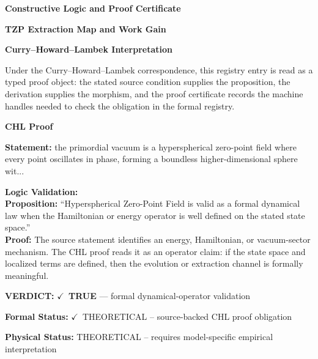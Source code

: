 \clearpage
\begingroup\tzpsupportsetup
\noindent\textbf{\fontsize{10.8pt}{12.8pt}\selectfont [ID 0177] Constructive Logic and Proof Certificate}\par
\noindent\textbf{\fontsize{10pt}{12pt}\selectfont TZP Extraction Map and Work Gain}\par
\vspace{0.45em}
\begingroup
\footnotesize
\setlength{\parskip}{0.22em}
\setlength{\parindent}{0pt}
\noindent\textbf{Curry--Howard--Lambek Interpretation}\par
Under the Curry--Howard--Lambek correspondence, this registry entry is read as a typed proof
object: the stated source condition supplies the proposition, the derivation supplies the
morphism, and the proof certificate records the machine handles needed to check the obligation
in the formal registry.

\vspace{0.45em}
\noindent\textbf{CHL Proof}\par
\textbf{Statement:} the primordial vacuum is a hyperspherical zero-point field where every point oscillates
in phase, forming a boundless higher-dimensional sphere wit...

\textbf{Logic Validation:}\\
\textbf{Proposition:} ``Hyperspherical Zero-Point Field is valid as a formal dynamical law when the Hamiltonian
or energy operator is well defined on the stated state space.''\\
\textbf{Proof:} The source statement identifies an energy, Hamiltonian, or vacuum-sector mechanism. The
CHL proof reads it as an operator claim: if the state space and localized terms are
defined, then the evolution or extraction channel is formally meaningful.

\textbf{VERDICT:} \ensuremath{\checkmark}\ \textbf{TRUE} --- formal dynamical-operator validation

\textbf{Formal Status:} \ensuremath{\checkmark}\ THEORETICAL -- source-backed CHL proof obligation

\textbf{Physical Status:} THEORETICAL -- requires model-specific empirical interpretation
\par\vspace{0.45em}
\par
\ifTZPDarkEdition
{}
\fi
\endgroup
\endgroup
